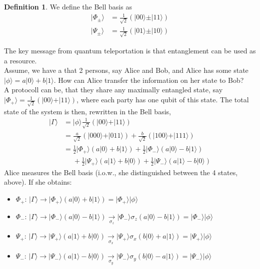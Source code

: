 \documentclass[12pt]{book}
\theoremstyle{definition}
\newtheorem*{defi}{\bfseries Definition}
\renewcommand{\to}{\longrightarrow}
\newcommand{\si}{\sigma}
\newcommand{\para}[1]{\left( {#1} \right)}
\newcommand{\ket}[1]{\vert {#1} \rangle}
\begin{document}
\begin{defi}
  We define the Bell basis as
  \begin{align}
    \ket{\Phi_\pm} & = \frac{1}{\sqrt{2}} \para{\ket{00} \pm \ket{11}} \\
    \ket{\Psi_\pm} & = \frac{1}{\sqrt{2}} \para{\ket{01} \pm \ket{10}}
  \end{align}
\end{defi}
The key message from quantum teleportation is that entanglement can be used as a resource. \\
Assume, we have a that 2 persons, say Alice and Bob, and Alice has some state $\ket{\phi} = a \ket{0} + b \ket{1}$. How can Alice transfer the information on her state to Bob? \\
A protocoll can be, that they share any maximally entangled state, say $\ket{\Phi_+} = \frac{1}{\sqrt{2}} \para{\ket{00} + \ket{11}}$, where each party has one qubit of this state. The total state of the system is then, rewritten in the Bell basis,
\begin{align*}
  \ket{\Gamma} & = \ket{\phi} \frac{1}{\sqrt{2}} \para{\ket{00} + \ket{11}} \\
  & = \frac{a}{\sqrt{2}} \para{\ket{000} + \ket{011}} + \frac{b}{\sqrt{2}} \para{\ket{100} + \ket{111}} \\
  & = \frac{1}{2} \ket{\Phi_+} \para{a\ket{0} + b \ket{1}} + \frac{1}{2} \ket{\Phi_-} \para{a \ket{0} - b \ket{1}} \\
  & \phantom{=} + \frac{1}{2} \ket{\Psi_+} \para{a \ket{1} + b \ket{0}} + \frac{1}{2} \ket{\Psi_-} \para{a \ket{1} - b \ket{0}}
\end{align*}
Alice measures the Bell basis (i.o.w., she distinguished between the 4 states, above). If she obtains:
\begin{itemize}
  \item $\Phi_+$: $\ket{\Gamma} \to \ket{\Phi_+}\para{a \ket{0} + b \ket{1}} = \ket{\Phi_+} \ket{\phi}$
  \item $\Phi_-$: $\ket{\Gamma} \to \ket{\Phi_-} \para{a \ket{0} - b \ket{1}} \underset{\si_z}{\to} \ket{\Phi_-} \si_z \para{a \ket{0} - b \ket{1}} = \ket{\Phi_-}\ket{\phi}$
  \item $\Psi_+$: $\ket{\Gamma} \to \ket{\Psi_+} \para{a \ket{1} + b \ket{0}}\underset{\si_x}{\to} \ket{\Psi_+} \si_x \para{b\ket{0} + a \ket{1}} = \ket{\Psi_+}\ket{\phi}$
  \item $\Psi_-$: $\ket{\Gamma} \to \ket{\Psi_-} \para{a \ket{1} - b \ket{0}}\underset{\si_y}{\to} \ket{\Psi_-} \si_y \para{b\ket{0} - a \ket{1}} = \ket{\Psi_-}\ket{\phi}$
\end{itemize}
\end{document}
